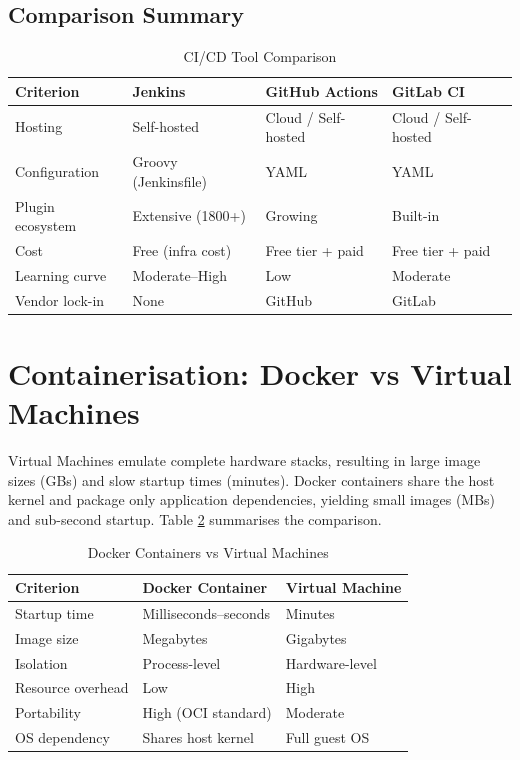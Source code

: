 \documentclass[12pt,a4paper]{report}
\begin{document}
\subsection{Comparison Summary}

\begin{table}[H]
\centering
\caption{CI/CD Tool Comparison}
\label{tab:cicd_comparison}
\begin{tabularx}{\textwidth}{@{}lXXX@{}}
\toprule
\textbf{Criterion} & \textbf{Jenkins} & \textbf{GitHub Actions} & \textbf{GitLab CI} \\
\midrule
Hosting         & Self-hosted       & Cloud / Self-hosted  & Cloud / Self-hosted \\
Configuration   & Groovy (Jenkinsfile) & YAML               & YAML \\
Plugin ecosystem & Extensive (1800+)  & Growing             & Built-in \\
Cost            & Free (infra cost) & Free tier + paid    & Free tier + paid \\
Learning curve  & Moderate–High     & Low                 & Moderate \\
Vendor lock-in  & None              & GitHub              & GitLab \\
\bottomrule
\end{tabularx}
\end{table}

\section{Containerisation: Docker vs Virtual Machines}
Virtual Machines emulate complete hardware stacks, resulting in large image sizes (GBs) and slow startup times (minutes). Docker containers \cite{docker_docs} share the host kernel and package only application dependencies, yielding small images (MBs) and sub-second startup. Table \ref{tab:docker_vm} summarises the comparison.

\begin{table}[H]
\centering
\caption{Docker Containers vs Virtual Machines}
\label{tab:docker_vm}
\begin{tabularx}{\textwidth}{@{}lXX@{}}
\toprule
\textbf{Criterion} & \textbf{Docker Container} & \textbf{Virtual Machine} \\
\midrule
Startup time   & Milliseconds–seconds  & Minutes \\
Image size     & Megabytes             & Gigabytes \\
Isolation      & Process-level         & Hardware-level \\
Resource overhead & Low                & High \\
Portability    & High (OCI standard)   & Moderate \\
OS dependency  & Shares host kernel    & Full guest OS \\
\bottomrule
\end{tabularx}
\end{table}
\end{document}
